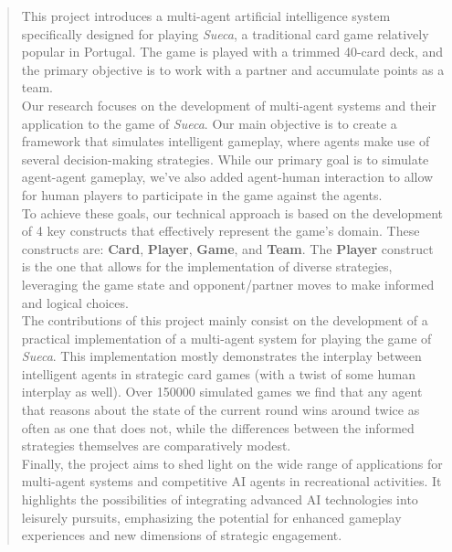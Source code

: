 \documentclass[sigconf]{acmart}
\begin{document}
\begin{abstract}
  \hspace*{0.7em} This project introduces a multi-agent artificial intelligence system specifically designed for playing \textit{Sueca}, a traditional card game relatively popular in Portugal. The game is played with a trimmed 40-card deck, and the primary objective is to work with a partner and accumulate points as a team.\\

  Our research focuses on the development of multi-agent systems and their application to the game of \textit{Sueca}. Our main objective is to create a framework that simulates intelligent gameplay, where agents make use of several decision-making strategies. While our primary goal is to simulate agent-agent gameplay, we've also added agent-human interaction to allow for human players to participate in the game against the agents.\\

  To achieve these goals, our technical approach is based on the development of 4 key constructs that effectively represent the game's domain. These constructs are: \textbf{Card}, \textbf{Player}, \textbf{Game}, and \textbf{Team}. The \textbf{Player} construct is the one that allows for the implementation of diverse strategies, leveraging the game state and opponent/partner moves to make informed and logical choices.\\

  The contributions of this project mainly consist on the development of a practical implementation of a multi-agent system for playing the game of \textit{Sueca}. This implementation mostly demonstrates the interplay between intelligent agents in strategic card games (with a twist of some human interplay as well). Over 150000 simulated games we find that any agent that reasons about the state of the current round wins around twice as often as one that does not, while the differences between the informed strategies themselves are comparatively modest.\\

  Finally, the project aims to shed light on the wide range of applications for multi-agent systems and competitive AI agents in recreational activities. It highlights the possibilities of integrating advanced AI technologies into leisurely pursuits, emphasizing the potential for enhanced gameplay experiences and new dimensions of strategic engagement.
\end{abstract}
\end{document}
